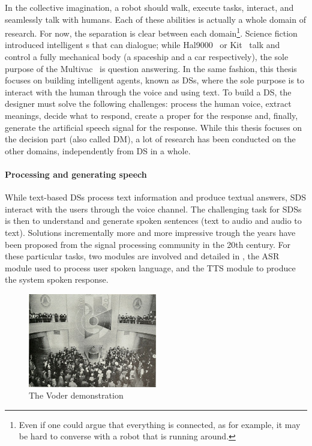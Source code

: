 In the collective imagination, a robot should walk, execute tasks, interact, and seamlessly talk with humans. Each of these abilities is actually a whole domain of research. For now, the separation is clear between each domain\footnote{Even if one could argue that everything is connected, as for example, it may be hard to converse with a robot that is running around.}. Science fiction introduced intelligent s that can dialogue; while Hal9000~\parencite{hal9000} or Kit~\parencite{k2000} talk and control a fully mechanical body (a spaceship and a car respectively), the sole purpose of the Multivac~\parencite{multivac} is question answering. In the same fashion, this thesis focuses on building intelligent agents, known as \glspl{DS}, where the sole purpose is to interact with the human through the voice and using text. To build a \gls{DS}, the designer must solve the following challenges: process the human voice, extract meanings, decide what to respond, create a proper  for the response and, finally, generate the artificial speech signal for the response. While this thesis focuses on the decision part (also called \gls{DM}), a lot of research has been conducted on the other domains, independently from \gls{DS} in a whole.


\paragraph{Processing and generating speech}

While text-based \glspl{DS} process text information and produce textual answers, \gls{SDS} interact with the users through the voice channel. The challenging task for \glspl{SDS} is then to understand and generate spoken sentences (text to audio and audio to text). Solutions incrementally more and more impressive trough the years have been proposed from the signal processing community in the 20th century. For these particular tasks, two modules are involved and detailed in , the \gls{ASR} module used to process user spoken language, and the \gls{TTS} module to produce the system spoken response.


\begin{figure}
    \centering
    \includegraphics[width=0.5\textwidth]{sources/introduction/voder-fair.jpg}
    \caption{\label{fig:world-fair} The Voder demonstration}
\end{figure}

